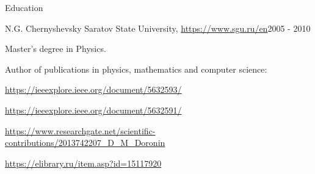 \documentclass{resume}
\begin{document}
\begin{rSection}{Education}

\begin{rSubsection}{N.G. Chernyshevsky Saratov State University, \url{https://www.sgu.ru/en}}{2005 - 2010}{}{}

Master's degree in Physics.

Author of publications in physics, mathematics and computer science:
\item \url{https://ieeexplore.ieee.org/document/5632593/}
\item \url{https://ieeexplore.ieee.org/document/5632591/}
\item \url{https://www.researchgate.net/scientific-contributions/2013742207_D_M_Doronin}
\item \url{https://elibrary.ru/item.asp?id=15117920}

\end{rSubsection}

\end{rSection}
\end{document}
